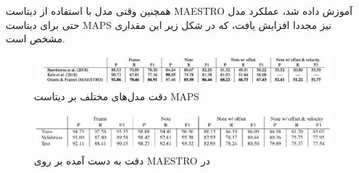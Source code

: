 همچنین وقتی مدل با استفاده از دیتاست
MAESTRO
آموزش داده شد، عملکرد مدل حتی برای دیتاست
MAPS
نیز مجددا افزایش یافت، که در شکل زیر این مقداری مشخص است.

\begin{figure}
    \includegraphics[width=\linewidth]
    {./statics/hawthorne2018enabling_maps_results.jpg}
    \caption{دقت مدل‌های مختلف بر دیتاست MAPS \cite{hawthorne2018enabling}}
\end{figure}

\begin{figure}
    \includegraphics[width=\linewidth]
    {./statics/hawthorne2018enabling_maestro_results.png}
    \caption{دقت به دست آمده بر روی MAESTRO در \cite{hawthorne2018enabling}}
\end{figure}